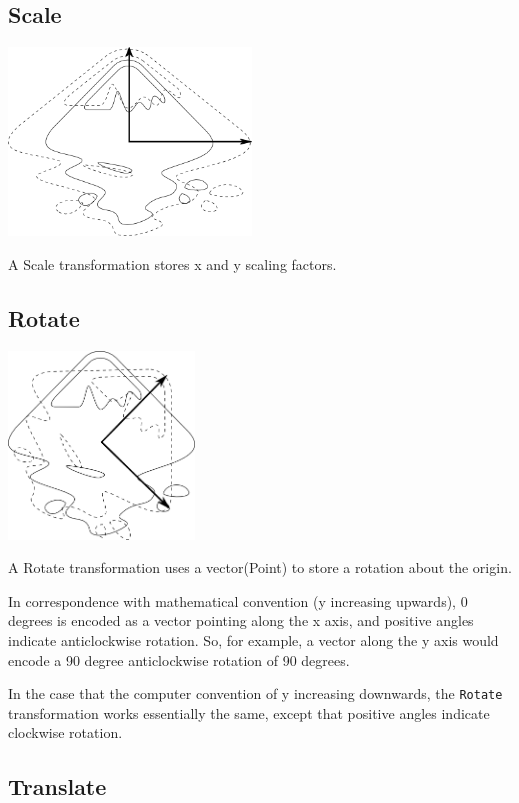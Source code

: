 \documentclass[openany]{book}
\newcommand{\code}[1]{\textsf{#1}}
\begin{document}
\subsection{Scale}

\includegraphics[height=50mm]{media/scale.png}

A \code{Scale} transformation stores x and y scaling factors.

\subsection{Rotate}

\includegraphics[height=50mm]{media/rotate.png}

A \code{Rotate} transformation uses a vector(\code{Point}) to store
a rotation about the origin.

In correspondence with mathematical convention (y increasing upwards),
0 degrees is encoded as a vector pointing along the x axis, and positive
angles indicate anticlockwise rotation.  So, for example, a vector along
the y axis would encode a 90 degree anticlockwise rotation of 90 degrees.

In the case that the computer convention of y increasing downwards,
the \verb}Rotate} transformation works essentially the same, except
that positive angles indicate clockwise rotation.

\subsection{Translate}
\end{document}
